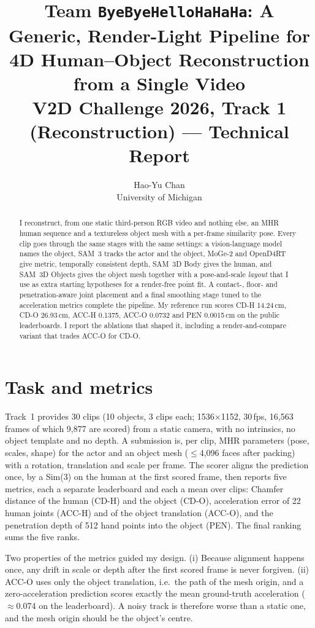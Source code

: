 \documentclass[10pt,twocolumn]{article}
\title{Team \texttt{ByeByeHelloHaHaHa}: A Generic, Render-Light Pipeline for\\4D Human--Object Reconstruction from a Single Video\\[2pt]
\large V2D Challenge 2026, Track 1 (Reconstruction) --- Technical Report}
\author{Hao-Yu Chan\\University of Michigan}
\date{}
\begin{document}
\maketitle

\begin{abstract}
I reconstruct, from one static third-person RGB video and nothing else, an MHR human sequence and a textureless
object mesh with a per-frame similarity pose. Every clip goes through the same stages with the same settings: a
vision-language model names the object, SAM~3 tracks the actor and the object, MoGe-2 and OpenD4RT give metric,
temporally consistent depth, SAM~3D Body gives the human, and SAM~3D Objects gives the object mesh together with a
pose-and-scale \emph{layout} that I use as extra starting hypotheses for a render-free point fit. A contact-, floor-
and penetration-aware joint placement and a final smoothing stage tuned to the acceleration metrics complete the
pipeline. My reference run scores CD-H 14.24\,cm, CD-O 26.93\,cm, ACC-H 0.1375, ACC-O 0.0732 and PEN 0.0015\,cm
on the public leaderboards. I report the ablations that shaped it, including a render-and-compare variant that
trades ACC-O for CD-O.
\end{abstract}

\section{Task and metrics}
Track~1 provides 30 clips (10 objects, 3 clips each; 1536$\times$1152, 30\,fps, 16{,}563 frames of which 9{,}877 are
scored) from a static camera, with no intrinsics, no object template and no depth. A submission is, per clip, MHR
parameters (pose, scales, shape) for the actor and an object mesh ($\le$4{,}096 faces after packing) with a
rotation, translation and scale per frame. The scorer aligns the prediction once, by a Sim(3) on the human at the
first scored frame, then reports five metrics, each a separate leaderboard and each a mean over clips: Chamfer
distance of the human (CD-H) and the object (CD-O), acceleration error of 22 human joints (ACC-H) and of the
object translation (ACC-O), and the penetration depth of 512 hand points into the object (PEN). The final ranking
sums the five ranks.

Two properties of the metrics guided my design. (i) Because alignment happens once, any drift in scale or depth
after the first scored frame is never forgiven. (ii) ACC-O uses only the object translation, i.e.\ the path of the
mesh origin, and a zero-acceleration prediction scores exactly the mean ground-truth acceleration ($\approx$0.074 on
the leaderboard). A noisy track is therefore worse than a static one, and the mesh origin should be the object's centre.
\end{document}

